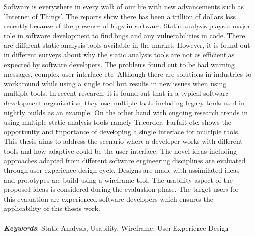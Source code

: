 Software is everywhere in every walk of our life with new advancements such as 'Internet of Things'. The reports show there has been a trillion of dollars loss recently because of the presence of bugs in software.  Static analysis plays a major role in software development to find bugs and any vulnerabilities in code. There are different static analysis tools available in the market. However, it is found out in different surveys about why the static analysis tools are not as efficient as expected by software developers. The problems found out to be bad warning messages, complex user interface etc. Although there are solutions in industries to workaround while using a single tool but results in new issues when using multiple tools. In recent research, it is found out that in a typical software development organisation, they use multiple tools including legacy tools used in nightly builds as an example. On the other hand with ongoing research trends in using multiple static analysis tools namely Tricorder, Parfait etc. shows the opportunity and importance of developing a single interface for multiple tools. This thesis aims to address the scenario where a developer works with different tools and how adaptive could be the user interface. The novel ideas including approaches adapted from different software engineering disciplines are evaluated through user experience design cycle. Designs are made with assimilated ideas and prototypes are build using a wireframe tool. The usability aspect of the proposed ideas is considered during the evaluation phase. The target users for this evaluation are experienced software developers which ensures the applicability of this thesis work. \\ \\
\textbf{\textit{Keywords}}: Static Analysis, Usability, Wireframe, User Experience Design
